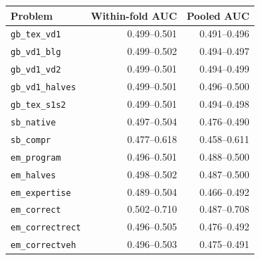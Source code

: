 \begin{tabular}{lrr}
\toprule
Problem & Within-fold AUC & Pooled AUC \\
\midrule
\texttt{gb\_tex\_vd1} & 0.499--0.501 & 0.491--0.496 \\
\texttt{gb\_vd1\_blg} & 0.499--0.502 & 0.494--0.497 \\
\texttt{gb\_vd1\_vd2} & 0.499--0.501 & 0.494--0.499 \\
\texttt{gb\_vd1\_halves} & 0.499--0.501 & 0.496--0.500 \\
\texttt{gb\_tex\_s1s2} & 0.499--0.501 & 0.494--0.498 \\
\texttt{sb\_native} & 0.497--0.504 & 0.476--0.490 \\
\texttt{sb\_compr} & 0.477--0.618 & 0.458--0.611 \\
\texttt{em\_program} & 0.496--0.501 & 0.488--0.500 \\
\texttt{em\_halves} & 0.498--0.502 & 0.487--0.500 \\
\texttt{em\_expertise} & 0.489--0.504 & 0.466--0.492 \\
\texttt{em\_correct} & 0.502--0.710 & 0.487--0.708 \\
\texttt{em\_correctrect} & 0.496--0.505 & 0.476--0.492 \\
\texttt{em\_correctveh} & 0.496--0.503 & 0.475--0.491 \\
\bottomrule
\end{tabular}
